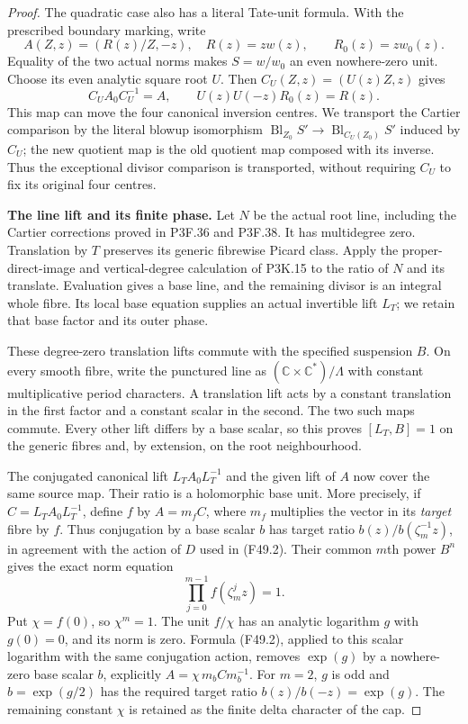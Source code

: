 \begin{proof}
The quadratic case also has a literal Tate-unit formula. With
the prescribed boundary marking, write
\[
 A(Z,z)=(R(z)/Z,-z),\quad R(z)=z w(z),\qquad
 R_0(z)=z w_0(z).
\]
Equality of the two actual norms makes $S=w/w_0$ an even
nowhere-zero unit. Choose its even analytic square root $U$.
Then $C_U(Z,z)=(U(z)Z,z)$ gives
\[
 C_UA_0C_U^{-1}=A,
 \qquad U(z)U(-z)R_0(z)=R(z).                              \tag{F49.3a}
\]
This map can move the four canonical inversion centres.
We transport the Cartier comparison by the literal blowup
isomorphism
$\operatorname{Bl}_{Z_0}S'\to
\operatorname{Bl}_{C_U(Z_0)}S'$ induced by $C_U$; the new
quotient map is the old quotient map composed with its inverse.
Thus the exceptional divisor comparison is transported, without
requiring $C_U$ to fix its original four centres.

\par\medskip\noindent\textbf{The line lift and its finite phase.}
Let $N$ be the actual root line, including the Cartier corrections
proved in P3F.36 and P3F.38. It has multidegree zero. Translation
by $T$ preserves its generic fibrewise Picard class. Apply the
proper-direct-image and vertical-degree calculation of P3K.15
to the ratio of $N$ and its translate. Evaluation gives a base
line, and the remaining divisor is an integral whole fibre.
Its local base equation supplies an actual invertible lift
$L_T$; we retain that base factor and its outer phase.

These degree-zero translation lifts commute with the specified
suspension $B$. On every smooth fibre, write the punctured line
as $(\mathbb C\times\mathbb C^*)/\Lambda$ with constant
multiplicative period characters. A translation lift acts by
a constant translation in the first factor and a constant scalar
in the second. The two such maps commute. Every other lift
differs by a base scalar, so this proves $[L_T,B]=1$ on the
generic fibres and, by extension, on the root neighbourhood.

The conjugated canonical lift $L_TA_0L_T^{-1}$ and the given
lift of $A$ now cover the same source map. Their ratio is a
holomorphic base unit. More precisely, if
$C=L_TA_0L_T^{-1}$, define $f$ by $A=m_fC$, where $m_f$
multiplies the vector in its \emph{target} fibre by $f$.
Thus conjugation by a base scalar $b$ has target ratio
$b(z)/b(\zeta_m^{-1}z)$, in agreement with the action of $D$
used in (F49.2). Their common $m$th power $B^n$
gives the exact norm equation
\[
               \prod_{j=0}^{m-1}f(\zeta_m^jz)=1.             \tag{F49.4}
\]
Put $\chi=f(0)$, so $\chi^m=1$. The unit $f/\chi$ has an
analytic logarithm $g$ with $g(0)=0$, and its norm is zero.
Formula (F49.2), applied to this scalar logarithm with the same
conjugation action, removes $\exp(g)$ by a nowhere-zero base
scalar $b$, explicitly
$A=\chi\,m_b C m_b^{-1}$. For $m=2$, $g$ is odd and
$b=\exp(g/2)$ has the required target ratio
$b(z)/b(-z)=\exp(g)$. The remaining constant $\chi$ is retained as the finite
delta character of the cap.


\end{proof}
